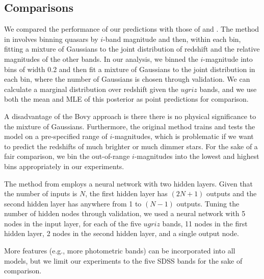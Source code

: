 \documentclass{article} %
\begin{document}
\subsection{Comparisons}
We compared the performance of our predictions with those of \cite{bovy2012photometric} and \cite{brescia2013photometric}. The method in \cite{bovy2012photometric} involves binning
quasars by $i$-band magnitude and then, within each bin,
fitting a mixture of Gaussians to the joint distribution of
redshift and the relative magnitudes of the other bands. In our analysis, we binned
the $i$-magnitude
into bins of width 0.2 and then fit a mixture of Gaussians to the joint distribution in each bin,
where the number of Gaussians is chosen through validation. We can calculate a marginal distribution
over redshift given the $ugriz$ bands, and we use both the mean and MLE of this posterior as
point predictions for comparison.

A disadvantage of the Bovy approach is there there is no physical significance to the mixture
of Gaussians. 
Furthermore, the original method trains and tests the model on a pre-specified range of $i$-magnitudes, which is problematic if we want to predict
the redshifts of much brighter or much dimmer stars. For the sake of a fair comparison, we bin
the out-of-range $i$-magnitudes into the lowest and highest bins appropriately in our experiments.

The method from \cite{brescia2013photometric} employs a neural network with two hidden layers. Given that the number of inputs is $N$, the first hidden layer has $(2N + 1)$ outputs and the second hidden layer has anywhere from 1 to $(N - 1)$ outputs. Tuning the number of hidden nodes through validation, we used a neural network with 5 nodes in the input layer, for each of the five $ugriz$ bands, 11 nodes in the first hidden layer, 2 nodes in the second hidden layer, and a single output node. 

More features (e.g., more photometric bands) can be incorporated into all models, but we limit our experiments to the five SDSS bands for the sake of comparison.  
\end{document}
